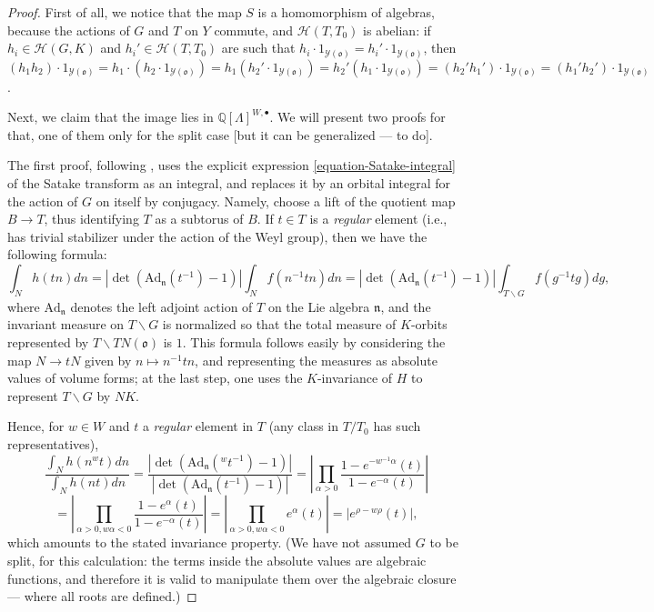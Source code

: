 \begin{proof}
 First of all, we notice that the map $S$ is a homomorphism of algebras, because the actions of $G$ and $T$ on $Y$ commute, and $\mathcal H(T,T_0)$ is abelian: if $h_i\in \mathcal H(G,K)$ and $h_i'\in \mathcal H(T,T_0)$ are such that $h_i\cdot  1_{\mathcal Y(\mathfrak o)} = h_i' \cdot 1_{\mathcal Y(\mathfrak o)}$, then $(h_1 h_2) \cdot 1_{\mathcal Y(\mathfrak o)} = h_1 \cdot (h_2 \cdot 1_{\mathcal Y(\mathfrak o)}) = h_1 ( h_2' \cdot 1_{\mathcal Y(\mathfrak o)}) = h_2' (h_1\cdot 1_{\mathcal Y(\mathfrak o)}) = (h_2'  h_1') \cdot 1_{\mathcal Y(\mathfrak o)} = (h_1'h_2')\cdot 1_{\mathcal Y(\mathfrak o)}$.
 
 Next, we claim that the image lies in $\mathbb Q[\Lambda]^{W,\bullet}$. We will present two proofs for that, one of them only for the split case [but it can be generalized --- to do]. 
 
 The first proof, following \cite{Cartier-Corvallis}, uses the explicit expression \eqref{equation-Satake-integral} of the Satake transform as an integral, and replaces it by an orbital integral for the action of $G$ on itself by conjugacy. Namely, choose a lift of the quotient map $B\to T$, thus identifying $T$ as a subtorus of $B$. If $t \in T$ is a \emph{regular} element (i.e., has trivial stabilizer under the action of the Weyl group), then we have the following formula:
 $$ \int_N h(t n) dn =  |\det(\text{Ad}_{\mathfrak n} (t^{-1}) - 1)| \int_N f(n^{-1} t n) dn = |\det(\text{Ad}_{\mathfrak n} (t^{-1}) - 1)| \int_{T\backslash G} f(g^{-1} t g) dg,$$
 where $\text{Ad}_{\mathfrak n}$ denotes the left adjoint action of $T$ on the Lie algebra $\mathfrak n$, and the invariant measure on $T\backslash G$ is normalized so that the total measure of $K$-orbits represented by $T\backslash TN(\mathfrak o)$ is $1$. This formula follows easily by considering the map $N\to tN$ given by $n\mapsto n^{-1} t n$, and representing the measures as absolute values of volume forms; at the last step, one uses the $K$-invariance of $H$ to represent $T\backslash G$ by $NK$. 
 
 Hence, for $w\in W$ and $t$ a \emph{regular} element in $T$ (any class in $T/T_0$ has such representatives),
 $$ \frac{\int_N h(n{^wt}) dn}{\int_N h(nt) dn} = \frac{|\det(\text{Ad}_{\mathfrak n} ({^wt^{-1}}) - 1)|}{|\det(\text{Ad}_{\mathfrak n} (t^{-1}) - 1)|} = \left | \prod_{\alpha > 0}  \frac{1-e^{-w^{-1}\alpha}(t)}{1-e^{-\alpha}(t)} \right |$$
 $$ = \left| \prod_{\alpha > 0, w\alpha <0}  \frac{1-e^{\alpha}(t)}{1-e^{-\alpha}(t)} \right| = \left| \prod_{\alpha > 0, w\alpha <0} e^{\alpha}(t)\right| = | e^{\rho -w\rho}(t)|,$$
 which amounts to the stated invariance property. (We have not assumed $G$ to be split, for this calculation: the terms inside the absolute values are algebraic functions, and therefore it is valid to manipulate them over the algebraic closure --- where all roots are defined.)
 

\end{proof}
